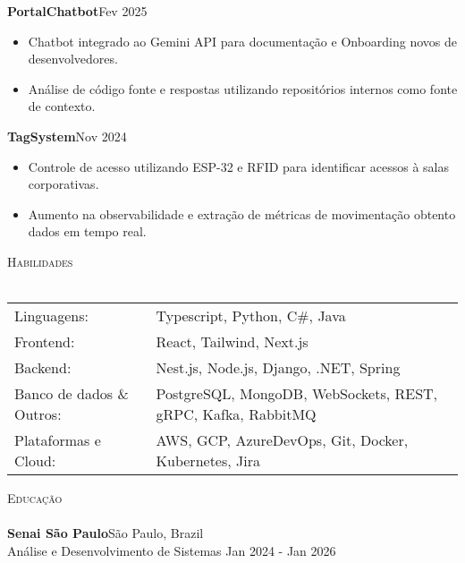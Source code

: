 \documentclass[a4paper]{article}
\newcommand{\lineunder}{
    \vspace*{-8pt} \\
    \hspace*{-18pt} \hrulefill \\
}
\newcommand{\header}[1]{
    {\hspace*{-18pt}\vspace*{6pt} \textsc{#1}}
    \vspace*{-6pt} \lineunder
}
\begin{document}
    \textbf{PortalChatbot}\hfill  Fev 2025\\
    \vspace{-3mm}
    \begin{itemize} \itemsep -3pt
        \item Chatbot integrado ao Gemini API para documentação e Onboarding novos de desenvolvedores.
        \item Análise de código fonte e respostas utilizando repositórios internos como fonte de contexto.
    \end{itemize}
    
    \textbf{TagSystem}\hfill  Nov 2024\\
    \vspace{-3mm}
    \begin{itemize} \itemsep -3pt
        \item Controle de acesso utilizando ESP-32 e RFID para identificar acessos à salas corporativas.
        \item Aumento na observabilidade e extração de métricas de movimentação obtento dados em tempo real.
    \end{itemize}

    
    \vspace{1mm}

    \header{Habilidades}
    \vspace{2mm}
    \begin{longtable}{p{4cm}p{12cm}}
        Linguagens: & Typescript, Python, C\#, Java \\
        Frontend: & React, Tailwind, Next.js  \\
        Backend: & Nest.js, Node.js, Django, .NET, Spring  \\
        Banco de dados \& Outros: & PostgreSQL, MongoDB, WebSockets, REST, gRPC, Kafka, RabbitMQ \\
        Plataformas e Cloud: & AWS, GCP, AzureDevOps, Git, Docker, Kubernetes, Jira  \\
    \end{longtable}
    \vspace{1mm}

    \header{Educação}
    \vspace{2mm}
    \textbf{Senai São Paulo}\hfill São Paulo, Brazil\\
      Análise e Desenvolvimento de Sistemas \hfill Jan 2024 - Jan 2026\\
\end{document}
